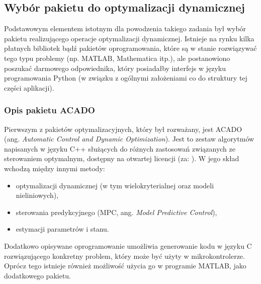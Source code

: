 \subsection{Wybór pakietu do optymalizacji dynamicznej}
\label{sub:czesc-wyzsza-wybor}

Podstawowym elementem istotnym dla powodzenia takiego zadania był wybór pakietu realizującego operacje optymalizacji dynamicznej. Istnieje na rynku kilka płatnych bibliotek bądź pakietów oprogramowania, które są w stanie rozwiązywać tego typu problemy (np. MATLAB, Mathematica itp.), ale postanowiono poszukać darmowego odpowiednika, który posiadałby interfejs w języku programowania Python (w związku z ogólnymi założeniami co do struktury tej części aplikacji).


\subsubsection{Opis pakietu ACADO}

Pierwszym z pakietów optymalizacyjnych, który był rozważany, jest ACADO (ang. \emph{Automatic Control and Dynamic
Optimization}). Jest to zestaw algorytmów napisanych w języku C++ służących do różnych zastosowań związanych ze sterowaniem optymalnym, dostępny na otwartej licencji (za: \cite{Houska2011}). W jego skład wchodzą między innymi metody:
\begin{itemize}
    \item optymalizacji dynamicznej (w tym wielokryterialnej oraz modeli nieliniowych),
    \item sterowania predykcyjnego (MPC, ang. \emph{Model Predictive Control}),
    \item estymacji parametrów i stanu.
\end{itemize}

Dodatkowo opisywane oprogramowanie umożliwia generowanie kodu w języku C rozwiązującego konkretny problem, który może być użyty w mikrokontrolerze. Oprócz tego istnieje również możliwość użycia go w programie MATLAB, jako dodatkowego pakietu.

